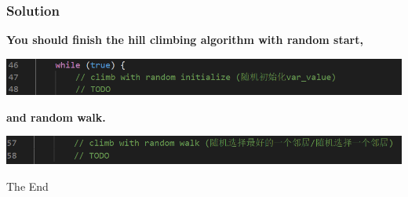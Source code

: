 \documentclass{beamer}
\begin{document}
\begin{frame}
  \frametitle{Solution}
      \textbf{You should finish the hill climbing algorithm with random start,}
      
      \includegraphics[width=1.0\textwidth]{Pic/h1}

      \textbf{and random walk.}
      
      \includegraphics[width=1.0\textwidth]{Pic/h2}

\end{frame}

\begin{frame}
  \Huge{\centerline{The End}}
\end{frame}

\end{document}
